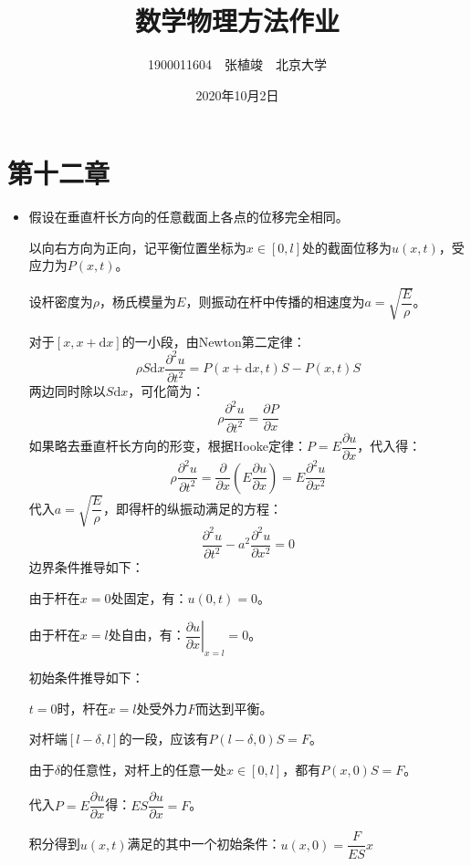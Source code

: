 \documentclass[a4paper,fontset=windows]{ctexart}
\begin{document}
\title{\textbf{数学物理方法作业}}
\author{1900011604\ \ 张植竣\ \ 北京大学}
\date{2020年10月2日}
\maketitle

\section*{第十二章}
\bigskip

\begin{itemize}

    \item[1.]
    假设在垂直杆长方向的任意截面上各点的位移完全相同。

    以向右方向为正向，记平衡位置坐标为$x \in [0,l]$处的截面位移为$u(x,t)$，受应力为$P(x,t)$。

    设杆密度为$\rho$，杨氏模量为$E$，则振动在杆中传播的相速度为$a = \sqrt{\dfrac{E}{\rho}}$。

    对于$[x,x+\mathrm{d}x]$的一小段，由Newton第二定律：
    \[
    \rho S\mathrm{d}x\frac{\partial^2 u}{\partial t^2} = P(x+\mathrm{d}x,t)S - P(x,t)S
    \]
    两边同时除以$S\mathrm{d}x$，可化简为：
    \[
    \rho\frac{\partial^2 u}{\partial t^2} = \frac{\partial P}{\partial x}
    \]
    如果略去垂直杆长方向的形变，根据Hooke定律：$P = E\dfrac{\partial u}{\partial x}$，代入得：
    \[
    \rho\frac{\partial^2 u}{\partial t^2} = \frac{\partial}{\partial x}\left(E\frac{\partial u}{\partial x}\right) = E\frac{\partial^2 u}{\partial x^2}
    \]
    代入$a = \sqrt{\dfrac{E}{\rho}}$，即得杆的纵振动满足的方程：
    \[
    \frac{\partial^2 u}{\partial t^2} - a^2\frac{\partial^2 u}{\partial x^2} = 0
    \]
    边界条件推导如下：

    由于杆在$x = 0$处固定，有：$u(0,t) = 0$。

    由于杆在$x = l$处自由，有：$\left.\dfrac{\partial u}{\partial x}\right|_{x=l} = 0$。

    初始条件推导如下：

    $t = 0$时，杆在$x=l$处受外力$F$而达到平衡。

    对杆端$[l-\delta,l]$的一段，应该有$P(l-\delta,0)S = F$。

    由于$\delta$的任意性，对杆上的任意一处$x \in [0,l]$，都有$P(x,0)S = F$。

    代入$P = E\dfrac{\partial u}{\partial x}$得：$ES\dfrac{\partial u}{\partial x} = F$。

    积分得到$u(x,t)$满足的其中一个初始条件：$u(x,0) = \dfrac{F}{ES}x$


\end{itemize}
\end{document}
